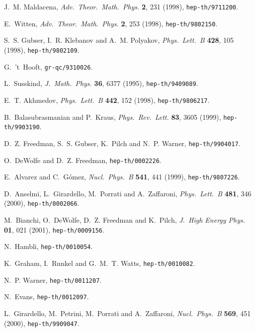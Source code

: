 \documentclass[a4paper,12pt]{article}
\begin{document}
\begin{thebibliography}{10}
\setlength{\itemsep}{0pt}
\raggedright
\renewcommand{\baselinestretch}{1}\normalfont

J.~M. Maldacena, \emph{Adv.~Theor.~Math.~Phys.} \textbf{2}, 231 (1998),
  \texttt{hep-th/9711200}.

E.~Witten, \emph{Adv.~Theor.~Math.~Phys.} \textbf{2}, 253 (1998),
  \texttt{hep-th/9802150}.

S.~S. Gubser, I.~R. Klebanov and A.~M. Polyakov, \emph{Phys.~Lett.~B}
  \textbf{428}, 105 (1998), \texttt{hep-th/9802109}.

G.~'t~Hooft, \texttt{gr-qc/9310026}.

L.~Susskind, \emph{J.~Math.~Phys.} \textbf{36}, 6377 (1995),
  \texttt{hep-th/9409089}.

E.~T. Akhmedov, \emph{Phys.~Lett.~B} \textbf{442}, 152 (1998),
  \texttt{hep-th/9806217}.

B.~Balasubrasmanian and P.~Kraus, \emph{Phys.~Rev.~Lett.} \textbf{83}, 3605
  (1999), \texttt{hep-th/9903190}.

D.~Z. Freedman, S.~S. Gubser, K.~Pilch and N.~P. Warner,
  \texttt{hep-th/9904017}.

O.~DeWolfe and D.~Z. Freedman, \texttt{hep-th/0002226}.

E.~Alvarez and C.~G\'{o}mez, \emph{Nucl.~Phys.~B} \textbf{541}, 441 (1999),
  \texttt{hep-th/9807226}.

D.~Anselmi, L.~Girardello, M.~Porrati and A.~Zaffaroni, \emph{Phys.~Lett.~B}
  \textbf{481}, 346 (2000), \texttt{hep-th/0002066}.

M.~Bianchi, O.~DeWolfe, D.~Z. Freedman and K.~Pilch, \emph{J.~High Energy
  Phys.} \textbf{01}, 021 (2001), \texttt{hep-th/0009156}.

N.~Hambli, \texttt{hep-th/0010054}.

K.~Graham, I.~Runkel and G.~M.~T. Watts, \texttt{hep-th/0010082}.

N.~P. Warner, \texttt{hep-th/0011207}.

N.~Evans, \texttt{hep-th/0012097}.

L.~Girardello, M.~Petrini, M.~Porrati and A.~Zaffaroni, \emph{Nucl.~Phys.~B}
  \textbf{569}, 451 (2000), \texttt{hep-th/9909047}.


\end{thebibliography}
\end{document}
